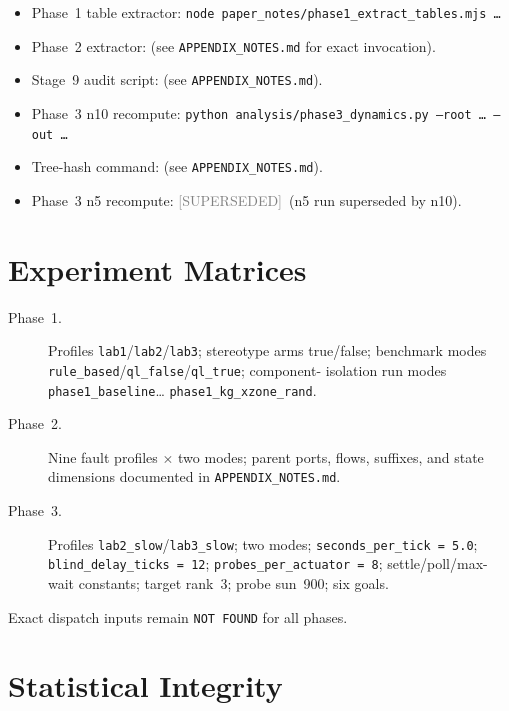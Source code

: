 \documentclass[12pt, a4paper, oneside]{memoir}
\newcommand{\evSuperseded}{\textcolor{gray}{[SUPERSEDED]}}
\newcommand{\qlT}{\texttt{ql\_true}}
\newcommand{\qlF}{\texttt{ql\_false}}
\begin{document}
\begin{itemize}
  \item Phase~1 table extractor:
        \texttt{node paper\_notes/phase1\_extract\_tables.mjs \ldots}
  \item Phase~2 extractor: (see \texttt{APPENDIX\_NOTES.md} for exact
        invocation).
  \item Stage~9 audit script: (see \texttt{APPENDIX\_NOTES.md}).
  \item Phase~3 n10 recompute:
        \texttt{python analysis/phase3\_dynamics.py --root \ldots{} --out
        \ldots}
  \item Tree-hash command: (see \texttt{APPENDIX\_NOTES.md}).
  \item Phase~3 n5 recompute: \evSuperseded\ (n5 run superseded by n10).
\end{itemize}

\chapter{Experiment Matrices}
\label{app:matrices}

\begin{description}
  \item[Phase~1.]
    Profiles \texttt{lab1}/\texttt{lab2}/\texttt{lab3}; stereotype arms
    true/false; benchmark modes \texttt{rule\_based}/\qlF/\qlT; component-%
    isolation run modes \texttt{phase1\_baseline}\ldots%
    \texttt{phase1\_kg\_xzone\_rand}.

  \item[Phase~2.]
    Nine fault profiles $\times$ two modes; parent ports, flows, suffixes,
    and state dimensions documented in \texttt{APPENDIX\_NOTES.md}.

  \item[Phase~3.]
    Profiles \texttt{lab2\_slow}/\texttt{lab3\_slow}; two modes;
    \texttt{seconds\_per\_tick = 5.0}; \texttt{blind\_delay\_ticks = 12};
    \texttt{probes\_per\_actuator = 8}; settle/poll/max-wait constants;
    target rank~3; probe sun~900; six goals.
\end{description}

Exact dispatch inputs remain \texttt{NOT FOUND} for all phases.

\chapter{Statistical Integrity}
\label{app:stats}
\end{document}
